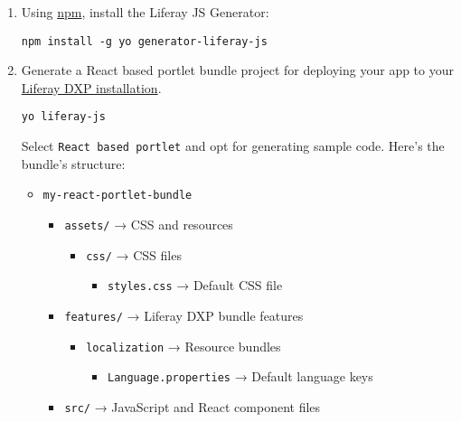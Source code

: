 \begin{enumerate}
\def\labelenumi{\arabic{enumi}.}
\item
  Using \href{https://www.npmjs.com/}{npm}, install the Liferay JS
  Generator:

\begin{verbatim}
npm install -g yo generator-liferay-js
\end{verbatim}
\item
  Generate a React based portlet bundle project for deploying your app
  to your \href{/deployment/docs/installing-product}{Liferay DXP
  installation}.

\begin{verbatim}
yo liferay-js
\end{verbatim}

  Select \texttt{React\ based\ portlet} and opt for generating sample
  code. Here's the bundle's structure:

  \begin{itemize}
  \tightlist
  \item
    \texttt{my-react-portlet-bundle}

    \begin{itemize}
    \tightlist
    \item
      \texttt{assets/} → CSS and resources

      \begin{itemize}
      \tightlist
      \item
        \texttt{css/} → CSS files

        \begin{itemize}
        \tightlist
        \item
          \texttt{styles.css} → Default CSS file
        \end{itemize}
      \end{itemize}
    \item
      \texttt{features/} → Liferay DXP bundle features

      \begin{itemize}
      \tightlist
      \item
        \texttt{localization} → Resource bundles

        \begin{itemize}
        \tightlist
        \item
          \texttt{Language.properties} → Default language keys
        \end{itemize}
      \end{itemize}
    \item
      \texttt{src/} → JavaScript and React component files


\end{itemize}
\end{itemize}
\end{enumerate}
